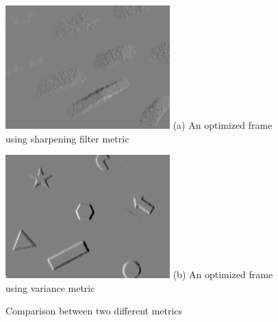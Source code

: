 \begin{figure}
  \begin{minipage}[t]{0.48\textwidth}
    \centering \includegraphics[width =
    \textwidth]{images/high_pass_contrast.png}
    (a) An optimized frame using sharpening filter metric
  \end{minipage}
  \hfill
  \begin{minipage}[t]{0.48\textwidth}
    \centering \includegraphics[width =
    \textwidth]{images/variance_contrast.png}
    (b) An optimized frame using variance metric
  \end{minipage}
  \caption{Comparison between two different metrics}
  \label{fig:contrast}
\end{figure}



